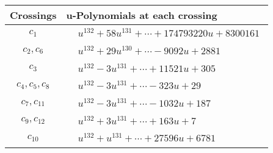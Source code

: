 \documentclass[1p]{elsarticle_modified}
\theoremstyle{definition}
\begin{document}
\begin{tabular}{m{50pt}|m{274pt}}
Crossings & \hspace{64pt}u-Polynomials at each crossing \\
\hline $$\begin{aligned}c_{1}\end{aligned}$$&$\begin{aligned}
&u^{132}+58 u^{131}+\cdots+174793220 u+8300161
\end{aligned}$\\
\hline $$\begin{aligned}c_{2},c_{6}\end{aligned}$$&$\begin{aligned}
&u^{132}+29 u^{130}+\cdots-9092 u+2881
\end{aligned}$\\
\hline $$\begin{aligned}c_{3}\end{aligned}$$&$\begin{aligned}
&u^{132}-3 u^{131}+\cdots+11521 u+305
\end{aligned}$\\
\hline $$\begin{aligned}c_{4},c_{5},c_{8}\end{aligned}$$&$\begin{aligned}
&u^{132}-3 u^{131}+\cdots-323 u+29
\end{aligned}$\\
\hline $$\begin{aligned}c_{7},c_{11}\end{aligned}$$&$\begin{aligned}
&u^{132}-3 u^{131}+\cdots-1032 u+187
\end{aligned}$\\
\hline $$\begin{aligned}c_{9},c_{12}\end{aligned}$$&$\begin{aligned}
&u^{132}+3 u^{131}+\cdots+163 u+7
\end{aligned}$\\
\hline $$\begin{aligned}c_{10}\end{aligned}$$&$\begin{aligned}
&u^{132}+u^{131}+\cdots+27596 u+6781
\end{aligned}$\\
\hline
\end{tabular}\\~\\
\end{document}
